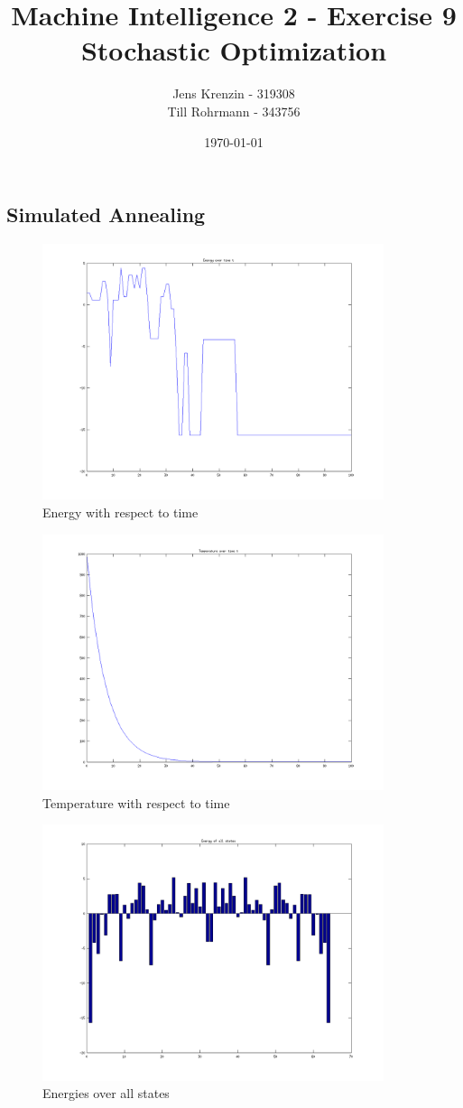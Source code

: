 \documentclass{article}
\title{Machine Intelligence 2 - Exercise 9\\
Stochastic Optimization}
\author{Jens Krenzin - 319308\\
Till Rohrmann - 343756}
\date{\today}
\begin{document}
	\maketitle
	\setcounter{section}{9}
	\subsection{Simulated Annealing}
		\begin{figure}[H]
			\includegraphics[width=10cm]{energy.png}
			\caption{Energy with respect to time}
		\end{figure}
		\begin{figure}[H]
			\includegraphics[width=10cm]{temperature.png}
			\caption{Temperature with respect to time}
		\end{figure}
		\begin{figure}[H]
			\includegraphics[width=10cm]{energies.png}
			\caption{Energies over all states}
		\end{figure}
\end{document}
